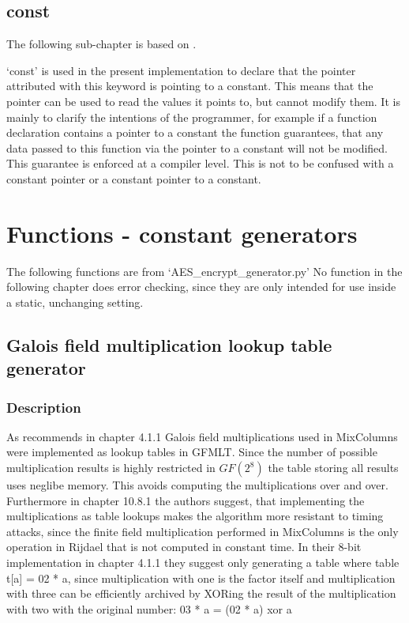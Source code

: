 \hypertarget{const}{%
\subsection{const}\label{const}}

The following sub-chapter is based on \cite[ch. 1.4.2: Constants and Pointers]{cpointers}.

`const' is used in the present implementation to declare that the
pointer attributed with this keyword is pointing to a constant. This
means that the pointer can be used to read the values it points to, but
cannot modify them. It is mainly to clarify the intentions of the
programmer, for example if a function declaration contains a pointer to
a constant the function guarantees, that any data passed to this
function via the pointer to a constant will not be modified. This
guarantee is enforced at a compiler level. This is not to be confused
with a constant pointer or a constant pointer to a constant.

\hypertarget{functions---constant-generators}{%
\section{Functions - constant
generators}\label{functions---constant-generators}}

The following functions are from `AES\_encrypt\_generator.py' No
function in the following chapter does error checking, since they are
only intended for use inside a static, unchanging setting.

\hypertarget{galois-field-multiplication-lookup-table-generator}{%
\subsection{Galois field multiplication lookup table
generator}\label{galois-field-multiplication-lookup-table-generator}}

\hypertarget{description}{%
\subsubsection{Description}\label{description}}

As \cite{rijndael} recommends in chapter 4.1.1 Galois field multiplications
used in MixColumns were implemented as lookup tables in GFMLT. Since the
number of possible multiplication results is highly restricted in $GF(2^{8})$
the table storing all results uses neglibe memory. This avoids computing
the multiplications over and over. Furthermore in chapter 10.8.1 the
authors suggest, that implementing the multiplications as table lookups
makes the algorithm more resistant to timing attacks, since the finite
field multiplication performed in MixColumns is the only operation in
Rijdael that is not computed in constant time. In their 8-bit
implementation in chapter 4.1.1 they suggest only generating a table
where table t[a] = 02 * a, since multiplication with one is the factor
itself and multiplication with three can be efficiently archived by
XORing the result of the multiplication with two with the original
number: 03 * a = (02 * a) xor a 

